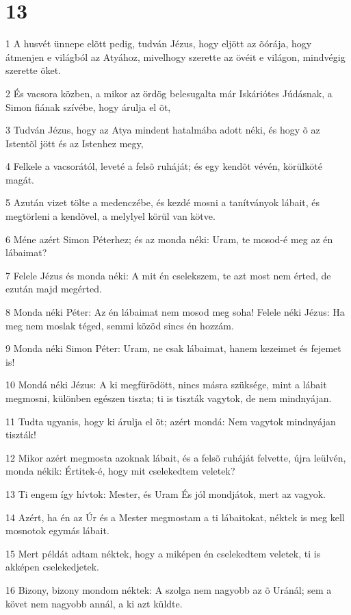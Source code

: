 \chapter{13}

\par 1 A husvét ünnepe elõtt pedig, tudván Jézus, hogy eljött az õórája, hogy átmenjen e világból az Atyához, mivelhogy szerette az övéit e világon, mindvégig szerette õket.
\par 2 És vacsora közben, a mikor az ördög belesugalta már Iskáriótes Júdásnak, a Simon fiának szívébe, hogy árulja el õt,
\par 3 Tudván Jézus, hogy az Atya mindent hatalmába adott néki, és hogy õ az Istentõl jött és az Istenhez megy,
\par 4 Felkele a vacsorától, leveté a felsõ ruháját; és egy kendõt vévén, körülköté magát.
\par 5 Azután vizet tölte a medenczébe, és kezdé mosni a tanítványok lábait, és megtörleni a kendõvel, a melylyel körül van kötve.
\par 6 Méne azért Simon Péterhez; és az monda néki: Uram, te mosod-é meg az én lábaimat?
\par 7 Felele Jézus és monda néki: A mit én cselekszem, te azt most nem érted, de ezután majd megérted.
\par 8 Monda néki Péter: Az én lábaimat nem mosod meg soha! Felele néki Jézus: Ha meg nem moslak téged, semmi közöd sincs én hozzám.
\par 9 Monda néki Simon Péter: Uram, ne csak lábaimat, hanem kezeimet és fejemet is!
\par 10 Mondá néki Jézus: A ki megfürödött, nincs másra szüksége, mint a lábait megmosni, különben egészen tiszta; ti is tiszták vagytok, de nem mindnyájan.
\par 11 Tudta ugyanis, hogy ki árulja el õt; azért mondá: Nem vagytok mindnyájan tiszták!
\par 12 Mikor azért megmosta azoknak lábait, és a felsõ ruháját felvette, újra leülvén, monda nékik: Értitek-é, hogy mit cselekedtem veletek?
\par 13 Ti engem így hívtok: Mester, és Uram  És jól mondjátok, mert az vagyok.
\par 14 Azért, ha én az Úr és a Mester megmostam a ti lábaitokat, néktek is meg kell mosnotok egymás lábait.
\par 15 Mert példát adtam néktek, hogy a miképen én cselekedtem veletek, ti is akképen cselekedjetek.
\par 16 Bizony, bizony mondom néktek: A szolga nem nagyobb az õ Uránál; sem a követ nem nagyobb annál, a ki azt küldte.
